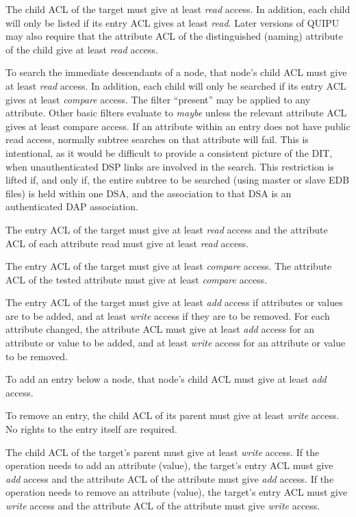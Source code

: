 \begin{describe}
\item
[\verb+List+:]
The child ACL of the target must give at least {\em read} access. In addition,
each child will only be listed if its entry ACL gives at least {\em read}.
Later versions of QUIPU may also require that the attribute ACL of the
distinguished (naming) attribute of the child give at least {\em read} access.
\item
[\verb+Search+:]
To search the immediate descendants of a node, that node's child ACL must give
at least {\em read} access. In addition, each child will only be searched
if its entry ACL gives at least {\em compare} access. The filter ``present''
may be applied to any attribute. Other basic
filters evaluate to {\em maybe} unless the relevant attribute ACL gives at
least compare access.
If an attribute within an entry does not have public read access, normally
subtree searches on that attribute will fail.  This is intentional, as it
would be difficult to provide a consistent picture of the DIT, when unauthenticated 
DSP links are involved in the search.
This restriction is lifted if, and only if, the entire subtree to be 
searched (using master or
slave EDB files) is held within one DSA, and the association
to that DSA is an authenticated DAP association.
\item
[\verb+Read+:]
The entry ACL of the target must give at least {\em read} access and the 
attribute ACL of each attribute read must give at least {\em read} access.
\item
[\verb+Compare+:]
The entry ACL of the target must give at least {\em compare} access. The
attribute ACL of the tested attribute must give at least {\em compare}
access.
\item
[\verb+Modify+:]
The entry ACL of the target must give at least {\em add} access if attributes
or values are to be added, and at least {\em write} access if they are to
be removed. For each attribute changed, the attribute ACL must give at
least {\em add} access for an attribute or value to be added, and at least
{\em write} access for an attribute or value to be removed.
\item
[\verb+Add Entry+:]
To add an entry below a node, that node's child ACL must give at least
{\em add} access.
\item
[\verb+Remove Entry+:]

To remove an entry, the child ACL of its parent must give at least {\em write}
access. No rights to the entry itself are required.
\item[\verb+Modify RDN+:]

The child ACL of the target's parent must give at least {\em write} access.
If the operation needs to add an attribute (value), the target's entry ACL must
give {\em add} access and the attribute ACL of the attribute must give
{\em add} access.
If the operation needs to remove an attribute (value), the target's entry ACL 
must give {\em write} access and the attribute ACL of the attribute must give
{\em write} access.
\end{describe}

